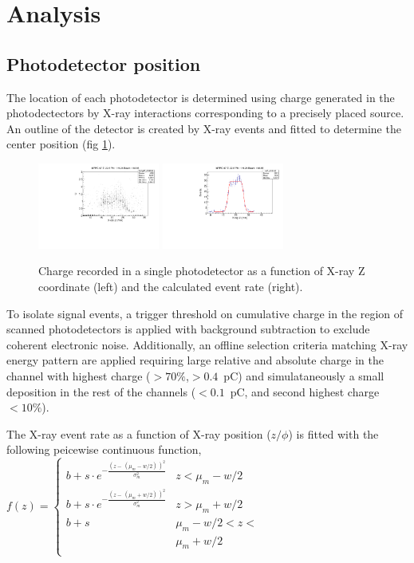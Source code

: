 \section{Analysis}

\subsection{Photodetector position}
The location of each photodetector is determined using charge
generated in the photodectectors by X-ray interactions corresponding
to a precisely placed source.  An outline of the detector is created
by X-ray events and fitted to determine the center position (fig
\ref{fig:xraycharge}). 

\begin{figure}[h]
  \includegraphics[width=4cm]{plots/2018/hcharge67_z}
  \includegraphics[width=4cm]{plots/2018/mppc_fit}
  \caption{Charge recorded in a single photodetector as a function of X-ray Z coordinate 
  (left) and 
    the calculated event rate (right).}
  \label{fig:xraycharge}
\end{figure}  

To isolate signal events, a trigger threshold on cumulative charge 
in the region of scanned photodetectors is applied with background 
subtraction to exclude coherent electronic noise. Additionally, 
an offline selection criteria matching X-ray energy pattern are applied
requiring large relative and absolute charge in the channel with highest charge
($>70\%$,$>0.4$~pC) and simulataneously a small deposition 
in the rest of the channels ($<0.1$~pC, and second highest charge$<10\%$).

The X-ray event rate as a function of X-ray position ($z/\phi$) is
fitted with the following peicewise continuous function,\\
\begin{math}\label{eqn:mppcfitfcn}
f(z) = 
\begin{cases}
   b+s\cdot e^{-\frac{(z - \, (\mu_m - w/2)\, )^2}{\sigma_m^2}} & z < \mu_m-w/2     \\
   b+s\cdot e^{-\frac{(z - \, (\mu_m + w/2)\, )^2}{\sigma_m^2}} & z > \mu_m+w/2     \\
   b+s                                         & \mu_m - w/2 < z < \\
                                               & \mu_m + w/2    \\
\end{cases}
\end{math}

